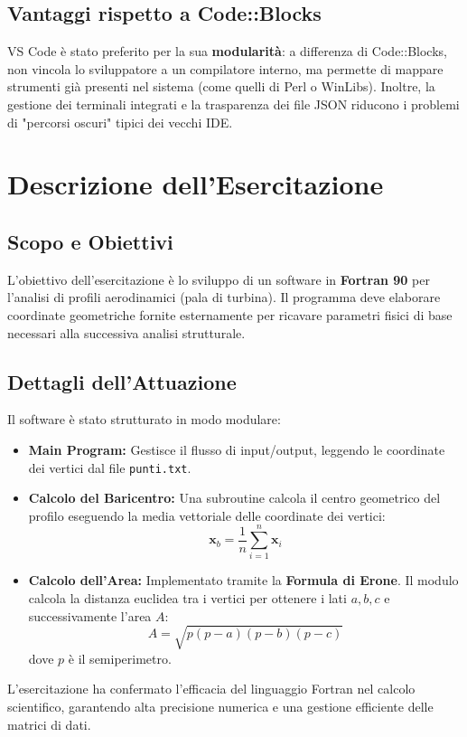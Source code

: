 \subsection{Vantaggi rispetto a Code::Blocks}
VS Code è stato preferito per la sua \textbf{modularità}: a differenza di Code::Blocks, non vincola lo sviluppatore a un compilatore interno, ma permette di mappare strumenti già presenti nel sistema (come quelli di Perl o WinLibs). Inoltre, la gestione dei terminali integrati e la trasparenza dei file JSON riducono i problemi di "percorsi oscuri" tipici dei vecchi IDE.

\section{Descrizione dell'Esercitazione}

\subsection{Scopo e Obiettivi}
L'obiettivo dell'esercitazione è lo sviluppo di un software in \textbf{Fortran 90} per l'analisi di profili aerodinamici (pala di turbina). Il programma deve elaborare coordinate geometriche fornite esternamente per ricavare parametri fisici di base necessari alla successiva analisi strutturale.

\subsection{Dettagli dell'Attuazione}
Il software è stato strutturato in modo modulare:
\begin{itemize}
    \item \textbf{Main Program:} Gestisce il flusso di input/output, leggendo le coordinate dei vertici dal file \texttt{punti.txt}.
    \item \textbf{Calcolo del Baricentro:} Una subroutine calcola il centro geometrico del profilo eseguendo la media vettoriale delle coordinate dei vertici: 
    \[ \mathbf{x}_b = \frac{1}{n} \sum_{i=1}^{n} \mathbf{x}_i \]
    \item \textbf{Calcolo dell'Area:} Implementato tramite la \textbf{Formula di Erone}. Il modulo calcola la distanza euclidea tra i vertici per ottenere i lati $a, b, c$ e successivamente l'area $A$:
    \[ A = \sqrt{p(p-a)(p-b)(p-c)} \]
    dove $p$ è il semiperimetro.
\end{itemize}

L'esercitazione ha confermato l'efficacia del linguaggio Fortran nel calcolo scientifico, garantendo alta precisione numerica e una gestione efficiente delle matrici di dati.